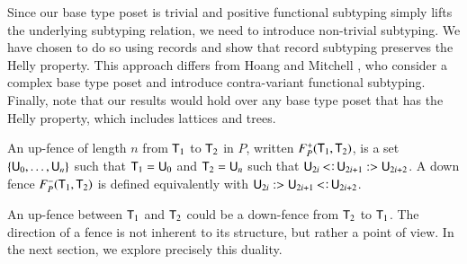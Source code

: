 \documentclass{report}
\begin{document}
  Since our base type poset is trivial and positive functional  
  subtyping simply lifts the underlying subtyping
  relation, we need to introduce
  non-trivial subtyping. We have chosen to do so using records and show  
  that
  record subtyping preserves the Helly property. This approach differs  
  from Hoang and Mitchell \cite{hoang:lower-bounds}, who consider a
  complex base type poset
  and introduce contra-variant functional subtyping. Finally, note that
  our results would hold over any base type poset that has the Helly  
  property, which includes lattices and trees.
  \begin{dfn}
    An up-fence of length $n$ from $\textsf{T}_1$ to $\textsf{T}_2$ in $P$,
    written $F_P^+(\textsf{T}_1, \textsf{T}_2)$, is a set
    $\left\{\textsf{U}_0,\ldots,\textsf{U}_n\right\}$ such that $\textsf{T}_1=\textsf{U}_0$
    and $\textsf{T}_2=\textsf{U}_n$ such that
    $\type{U}_{2i}\subtype\type{U}_{2i+1}\rsubtype\type{U}_{2i+2}$.
    A down fence $F_P^-(\textsf{T}_1, \textsf{T}_2)$ is defined equivalently with
    $\type{U}_{2i}\rsubtype\type{U}_{2i+1}\subtype\type{U}_{2i+2}$.
  \end{dfn}
  An up-fence between $\textsf{T}_1$ and $\textsf{T}_2$ could be a down-fence from $\textsf{T}_2$
  to $\textsf{T}_1$. The direction of a fence is not inherent to its structure, but rather a
  point of view. In the next section, we explore precisely this duality.
\end{document}
